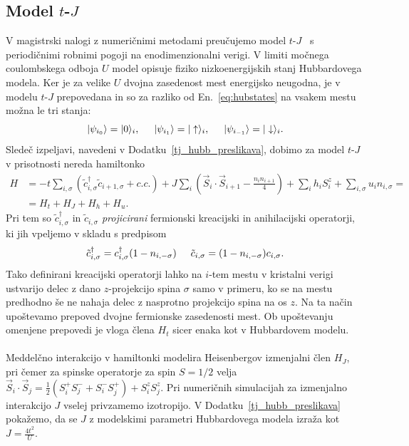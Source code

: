 \subsection{Model $t$-$J$}
V magistrski nalogi z numeričnimi metodami preučujemo model $t$-$J$~\cite{spalek2007tj} s periodičnimi robnimi pogoji na enodimenzionalni verigi. V limiti močnega coulombskega odboja $U$ model opisuje fiziko nizkoenergijskih stanj Hubbardovega modela. Ker je za velike $U$ dvojna zasedenost mest energijsko neugodna, je v modelu $t$-$J$ prepovedana in so za razliko od En.~\eqref{eq:hubstates} na vsakem mestu možna le tri stanja: 
\begin{equation}\label{eq:tjstates}
\vert\psi_{i_0}\rangle=\vert0\rangle_i, \hspace{5mm} \vert\psi_{i_1}\rangle=\vert\uparrow\rangle_i,\hspace{5mm} \vert\psi_{i_{-1}}\rangle=\vert\downarrow\rangle_i.
\end{equation}
Sledeč izpeljavi, navedeni v Dodatku~\ref{tj_hubb_preslikava}, dobimo za model $t$-$J$ v prisotnosti nereda hamiltonko
\begin{equation}\label{eq:tJ_ham}
\begin{split}
H&=-t\sum\limits_{i, \sigma} \left(\tilde{c}_{i,\sigma}^\dagger\tilde{c}_{i+1,\sigma} + c.c. \right) + J\sum\limits_i \left(\vec{S}_i\cdot \vec{S}_{i+1} - \frac{n_i n_{i+1}}{4}\right) + \sum\limits_i h_iS_i^z + \sum\limits_{i,\sigma} u_i n_{i,\sigma}=  \\
&=
H_t + H_J + H_h + H_u.
\end{split}
\end{equation}
Pri tem so $\tilde{c}_{i,\sigma}^\dagger$ in  $\tilde{c}_{i,\sigma}$ \emph{projicirani} fermionski kreacijski in anihilacijski operatorji, ki jih vpeljemo v skladu s predpisom 
\begin{equation}
\tilde{c}_{i,\sigma}^\dagger=c_{i,\sigma}^\dagger(1-n_{i,-\sigma}) \hspace{5mm}\tilde{c}_{i,\sigma}=(1-n_{i,-\sigma})c_{i,\sigma}.
\end{equation}
Tako definirani kreacijski operatorji lahko na $i$-tem mestu v kristalni verigi ustvarijo delec z dano $z$-projekcijo spina $\sigma$ samo v primeru, ko se na mestu predhodno še ne nahaja delec z nasprotno projekcijo spina na os $z$. Na ta način upoštevamo prepoved dvojne fermionske zasedenosti mest. Ob upoštevanju omenjene prepovedi je vloga člena $H_t$ sicer enaka kot v Hubbardovem modelu. \\\\ 
Meddelčno interakcijo v hamiltonki modelira Heisenbergov izmenjalni člen $H_J$, pri čemer za spinske operatorje za spin $S=1/2$ velja $\vec{S}_i\cdot \vec{S}_{j}=\frac{1}{2}\left(S_i^+S_j^- + S_i^-S_j^+\right) + S_i^zS_j^z$. Pri numeričnih simulacijah za izmenjalno interakcijo $J$ vselej privzamemo izotropijo. V Dodatku~\ref{tj_hubb_preslikava} pokažemo, da se $J$ z modelskimi parametri Hubbardovega modela izraža kot $J=\frac{4t^2}{U}.$ 
